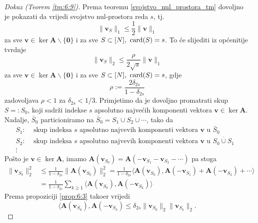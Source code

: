 \documentclass[a4paper,twoside,12pt]{memoir} %
\newcommand{\vect}[1]{\mathbf{#1}}
\renewcommand{\vec}{\vect}
\newcommand{\card}{\text{\normalfont{card}}}
\newcommand{\norm}[1]{\|{#1}\|}
\begin{document}
\begin{proof}[Dokaz (Teorem \ref{tm:6:9})]
    Prema teoremu \ref{svojstvo_nul_prostora_tm} dovoljno je pokazati da vrijedi svojstvo nul-prostora reda $s$, tj.
    \begin{equation*}
        \norm{\vec v_S}_1 \leq \frac{1}{2} \norm{\vec v}_1     
    \end{equation*}
    za sve $\vec v \in \ker \vec A \backslash \{\vec 0\}$ i za sve $S \subset [N],\  \card(S) = s$. To \'ce slijediti iz op\'cenitije tvrdnje  
    \begin{equation*}
        \norm{\vec v_S}_2 \leq \frac{\rho}{2 \sqrt{s}} \norm{\vec v}_1     
    \end{equation*}
    za sve $\vec v \in \ker \vec A \backslash \{\vec 0\}$ i za sve $S \subset [N],\  \card(S) = s$, gdje
    \begin{equation*}
        \rho := \frac{2 \delta_{2s}}{1 - \delta_{2s}}  
    \end{equation*}
    zadovoljava $\rho < 1$ za $\delta_{2s} < 1/3$.
    Primjetimo da je dovoljno promatrati skup $S =: S_0$, koji sadr\v{z}i indekse $s$ apsolutno najve\'cih komponenti vektora $\vec v \in \ker \vec A$. Nadalje, $\bar S_0$ particioniramo na $\bar S_0 = S_1 \cup S_2 \cup \cdots$, tako da
    \begin{align*}
       S_1:& \text{ skup indeksa $s$ apsolutno najve\'vih komponenti vektora $\vec v$ u $\bar S_0$}\\ 
       S_2:& \text{ skup indeksa $s$ apsolutno najve\'vih komponenti vektora $\vec v$ u $\overline{S_0 \cup S_1}$ }\\
       \vdots &
    \end{align*}
    Po\v{s}to je $\vec v \in \ker \vec A$, imamo $\vec A(\vec v_{S_0}) = \vec A(-\vec v_{S_1} - \vec v_{S_2} - \cdots)$ pa stoga
    \begin{align}
        \norm{\vec v_{S_0}}^2_2 &\leq \frac{1}{1- \delta_{2s}} \norm{\vec A(\vec v_{S_0})}^2_2 = \frac{1}{1-\delta_{2s}} \langle \vec A(\vec v_{S_0}), \vec A(-\vec v_{S_1}) + \vec A (- \vec v_{S_2}) + \cdots \rangle \nonumber \\
        &= \frac{1}{1-\delta_{2s}} \sum_{k \geq 1} \langle \vec A(\vec v_{S_0}), \vec A (- \vec v_{S_k}) \rangle \label{6:18}
    \end{align}
    Prema propoziciji \ref{prop:6:3} tako\dj er vrijedi
    \begin{equation}\label{6:19}
        \langle \vec A (\vec v_{S_0}), \vec A (-\vec v_{S_k})  \leq \delta_{2s} \norm{\vec v_{S_0}}_2 \norm{\vec v_{S_k}}_2.

\end{equation}
\end{proof}
\end{document}
